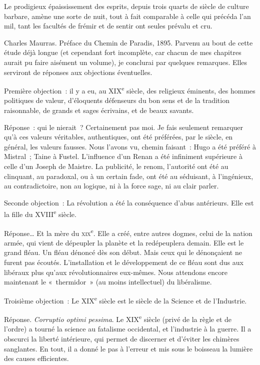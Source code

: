 \documentclass[french,twoside]{book} %
\newenvironment{quoteblock}%
  {\begin{quoting}}
  {\end{quoting}}
\newenvironment{quotebar}{%
    \def\FrameCommand{{\color{rubric!10!}\vrule width 0.5em} \hspace{0.9em}}%
    \def\OuterFrameSep{\itemsep} %
    \MakeFramed {\advance\hsize-\width \FrameRestore}
  }%
  {%
    \endMakeFramed
  }
\renewenvironment{quoteblock}%
  {%
    \savenotes
    \setstretch{0.9}
    \normalfont
    \begin{quotebar}
  }
  {%
    \end{quotebar}
    \spewnotes
  }
\begin{document}
\begin{quoteblock}
 \noindent Le prodigieux épaississement des esprits, depuis trois quarts de siècle de culture barbare, amène une sorte de nuit, tout à fait comparable à celle qui précéda l’an mil, tant les facultés de frémir et de sentir ont seules prévalu et cru.
 \par
\par
{\citbibl Charles Maurras. Préface du Chemin de Paradis, 1895.}
\end{quoteblock}
\noindent Parvenu au bout de cette étude déjà longue (et cependant fort incomplète, car chacun de mes chapitres aurait pu faire aisément un volume), je conclurai par quelques remarques. Elles serviront de réponses aux objections éventuelles.\par
Première objection : il y a eu, au XIX\textsuperscript{e} siècle, des religieux éminents, des hommes politiques de valeur, d’éloquents défenseurs du bon sens et de la tradition raisonnable, de grands et sages écrivains, et de beaux savants.\par
Réponse : qui le nierait ? Certainement pas moi. Je fais seulement remarquer qu’à ces valeurs véritables, authentiques, ont été préférées, par le siècle, en général, les valeurs fausses. Nous l’avons vu, chemin faisant : Hugo a été préféré à Mistral ; Taine à Fustel. L’influence d’un Renan a été infiniment supérieure à celle d’un Joseph de Maistre. La publicité, le renom, l’autorité ont été au clinquant, au paradoxal, ou à un certain fade, ont été au séduisant, à l’ingénieux, au contradictoire, non au logique, ni à la force sage, ni au clair parler.\par
Seconde objection : La révolution a été la conséquence d’abus antérieurs. Elle est la fille du XVIII\textsuperscript{e} siècle.\par
Réponse… Et la mère du \textsc{xix}\textsuperscript{e}. Elle a créé, entre autres dogmes, celui de la nation armée, qui vient de dépeupler la planète et la redépeuplera demain. Elle est le grand fléau. Un fléau dénoncé dès son début. Mais ceux qui le dénonçaient ne furent pas écoutés. L’installation et le développement de ce fléau sont dus aux libéraux plus qu’aux révolutionnaires eux-mêmes. Nous attendons encore maintenant le « thermidor » (au moins intellectuel) du libéralisme.\par
Troisième objection : Le XIX\textsuperscript{e} siècle est le siècle de la Science et de l’Industrie.\par
Réponse. {\itshape Corruptio optimi pessima}. Le XIX\textsuperscript{e} siècle (privé de la règle et de l’ordre) a tourné la science au fatalisme occidental, et l’industrie à la guerre. Il a obscurci la liberté intérieure, qui permet de discerner et d’éviter les chimères sanglantes. En tout, il a donné le pas à l’erreur et mis sous le boisseau la lumière des causes efficientes.\par
\end{document}
